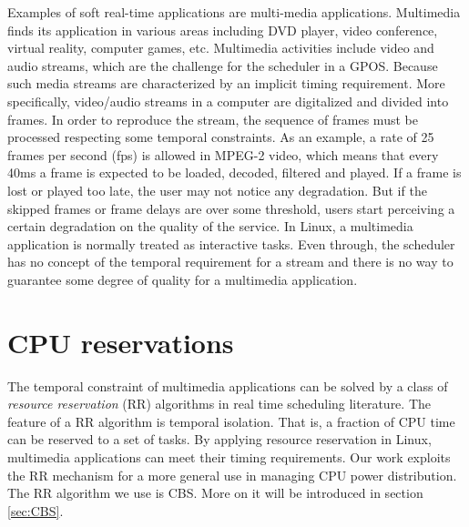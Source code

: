 Examples of soft real-time applications are multi-media applications. 
%
Multimedia finds its application in various areas including DVD player,
video conference, virtual reality, computer games, etc. Multimedia 
activities include video and audio streams, which are the challenge 
for the scheduler in a GPOS. Because such media streams are characterized 
by an implicit timing requirement. More specifically, video/audio streams 
in a computer are digitalized and divided into frames. In order to 
reproduce the stream, the sequence of frames must be processed 
respecting some temporal constraints. As an example, a rate of 25 frames 
per second (fps) is allowed in MPEG-2 video, which means that every 40ms 
a frame is expected to be loaded, decoded, filtered and played. If a frame 
is lost or played too late, the user may not notice any degradation. But 
if the skipped frames or frame delays are over some threshold, users start 
perceiving a certain degradation on the quality of the service. In Linux, 
a multimedia application is normally treated as interactive tasks. Even 
through, the scheduler has no concept of the temporal requirement for a 
stream and there is no way to guarantee some degree of quality for a 
multimedia application.    

\section{CPU reservations}
 
%
%
The temporal constraint of multimedia applications can be solved by
a class of \emph{resource reservation} (RR) algorithms in real time 
scheduling literature. The feature of a RR algorithm is temporal 
isolation. That is, a fraction of CPU time can be reserved to a set
of tasks. By applying resource reservation in Linux, multimedia
applications can meet their timing requirements. Our work exploits
the RR mechanism for a more general use in managing CPU power
distribution. The RR algorithm we use is CBS\cite{AbeniB98}. More 
on it will be introduced in section \ref{sec:CBS}.

